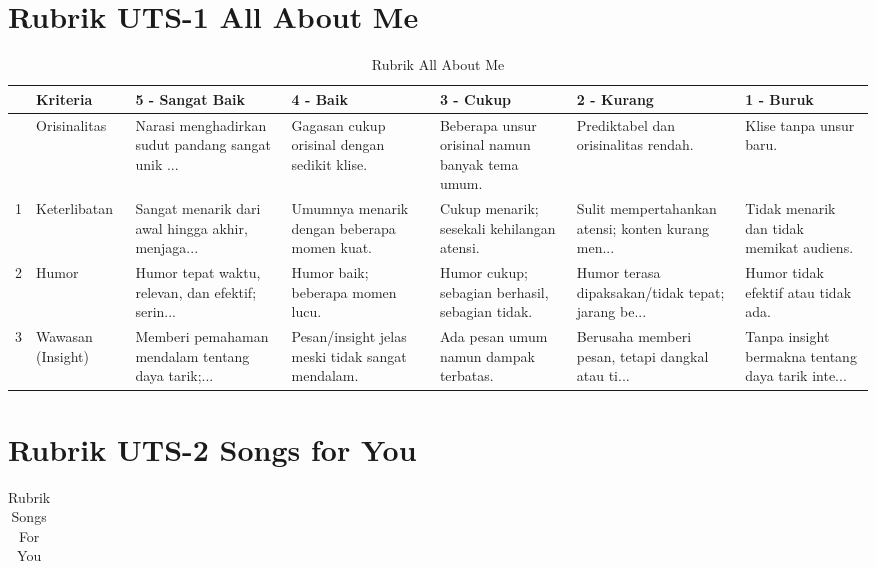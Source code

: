 \documentclass[
  letterpaper,
  DIV=11,
  numbers=noendperiod]{scrreprt}
\begin{document}
\begin{landscape}

\chapter{Rubrik UTS-1 All About Me}\label{rubrik-uts-1-all-about-me}

\begin{longtable}[]{@{}lllllll@{}}

\caption{\label{tbl-rubric_uts-1}Rubrik All About Me}

\tabularnewline

\toprule\noalign{}
& Kriteria & 5 - Sangat Baik & 4 - Baik & 3 - Cukup & 2 - Kurang & 1 -
Buruk \\
\midrule\noalign{}
\endhead
\bottomrule\noalign{}
\endlastfoot
0 & Orisinalitas & Narasi menghadirkan sudut pandang sangat unik ... &
Gagasan cukup orisinal dengan sedikit klise. & Beberapa unsur orisinal
namun banyak tema umum. & Prediktabel dan orisinalitas rendah. & Klise
tanpa unsur baru. \\
1 & Keterlibatan & Sangat menarik dari awal hingga akhir, menjaga... &
Umumnya menarik dengan beberapa momen kuat. & Cukup menarik; sesekali
kehilangan atensi. & Sulit mempertahankan atensi; konten kurang men... &
Tidak menarik dan tidak memikat audiens. \\
2 & Humor & Humor tepat waktu, relevan, dan efektif; serin... & Humor
baik; beberapa momen lucu. & Humor cukup; sebagian berhasil, sebagian
tidak. & Humor terasa dipaksakan/tidak tepat; jarang be... & Humor tidak
efektif atau tidak ada. \\
3 & Wawasan (Insight) & Memberi pemahaman mendalam tentang daya
tarik;... & Pesan/insight jelas meski tidak sangat mendalam. & Ada pesan
umum namun dampak terbatas. & Berusaha memberi pesan, tetapi dangkal
atau ti... & Tanpa insight bermakna tentang daya tarik inte... \\

\end{longtable}

\chapter{Rubrik UTS-2 Songs for You}\label{rubrik-uts-2-songs-for-you}

\begin{longtable}[]{@{}lllllll@{}}

\caption{\label{tbl-rubric_uts-2}Rubrik Songs For You}


\end{longtable}
\end{landscape}
\end{document}
